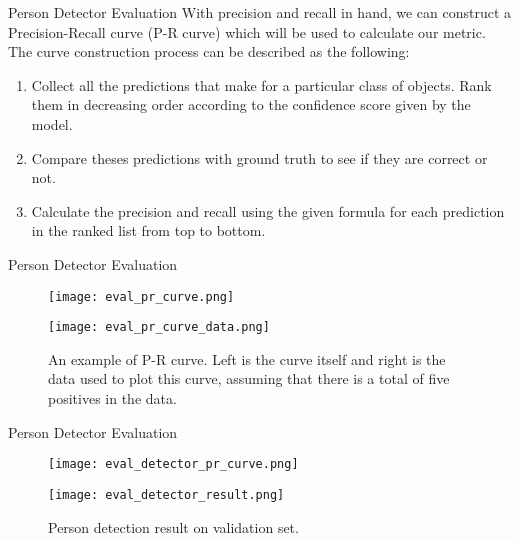\begin{frame}{Person Detector Evaluation}
    With precision and recall in hand, we can construct a Precision-Recall curve
    (P-R curve) which will be used to calculate our metric. The curve
    construction process can be described as the following:
    
    \begin{enumerate}
        \item Collect all the predictions that make for a particular class of
        objects. Rank them in decreasing order according to the confidence score
        given by the model.
        \item  Compare theses predictions with ground truth to see if they are 
        correct or not.
        \item Calculate the precision and recall using the given formula for 
        each prediction in the ranked list from top to bottom.
    \end{enumerate}
\end{frame}

\begin{frame}{Person Detector Evaluation}
    \begin{figure}
        \centering
        \begin{minipage}[b]{0.65\textwidth}
            \centering
            \texttt{[image: eval\_pr\_curve.png]}
        \end{minipage}%
        \begin{minipage}[b]{0.35\textwidth}
            \centering
            \texttt{[image: eval\_pr\_curve\_data.png]}
        \end{minipage}
        \caption[An example of Precision-Recall curve]
        {An example of P-R curve. Left is the curve itself and right is the data
            used to plot this curve, assuming that there is a total of five 
            positives
            in the data.}
        \label{fig:eval-pr-curve}
    \end{figure}
\end{frame}

\begin{frame}{Person Detector Evaluation}
    \begin{figure}
        \centering
        \texttt{[image: eval\_detector\_pr\_curve.png]}
        \caption{Person detection model's Precision-Recall curve on 
            validation set.}
        \texttt{[image: eval\_detector\_result.png]}
        \caption{Person detection result on validation set.}
    \end{figure}
\end{frame}

